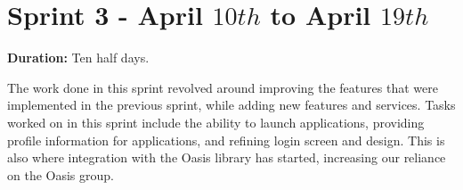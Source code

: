 \section{Sprint 3 - April $10th$ to April $19th$}

\textbf{Duration:} Ten half days. \newline

The work done in this sprint revolved around improving the features that were implemented in the previous sprint, while adding new features and services. 
Tasks worked on in this sprint include the ability to launch applications, providing profile information for applications, and refining login screen and design. 
This is also where integration with the Oasis library has started, increasing our reliance on the Oasis group. 